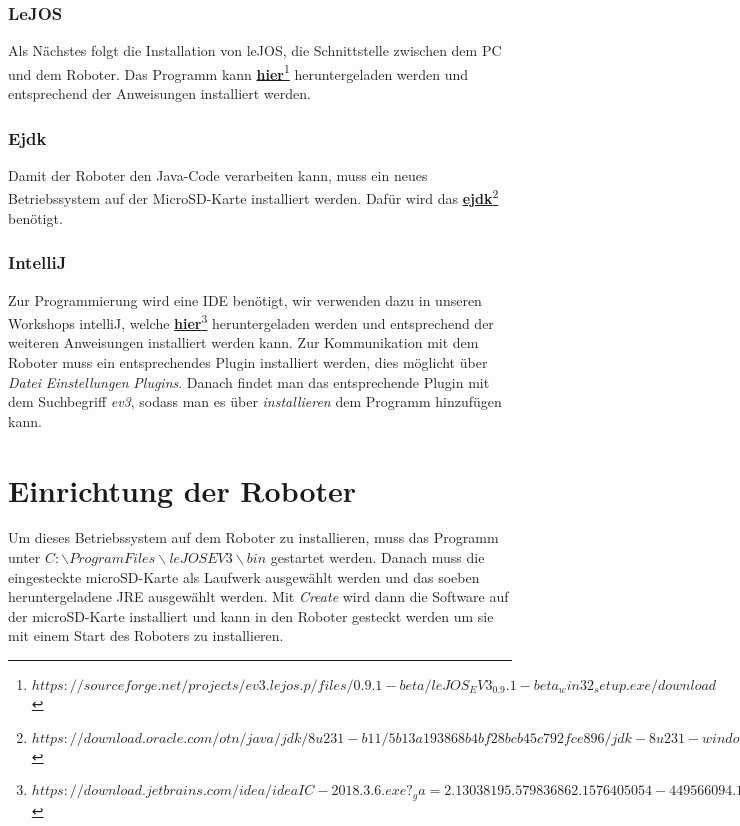\documentclass[
	ngerman,
	accentcolor=1c,%
	]{tudapub}
\begin{document}
\subsubsection{LeJOS}
Als N\"achstes folgt die Installation von leJOS, die Schnittstelle zwischen dem PC und dem Roboter. Das Programm kann
\href{https://sourceforge.net/projects/ev3.lejos.p/files/0.9.1-beta/leJOS_EV3_0.9.1-beta_win32_setup.exe/download}{\textbf{hier}\footnote{$https://sourceforge.net/projects/ev3.lejos.p/files/0.9.1-beta/leJOS_EV3_0.9.1-beta_win32_setup.exe/download$}}
heruntergeladen werden und entsprechend der Anweisungen installiert werden.

\subsubsection{Ejdk}
Damit der Roboter den Java-Code verarbeiten kann, muss ein neues Betriebssystem auf der MicroSD-Karte installiert werden. Daf\"ur wird das 
\href{https://download.oracle.com/otn/java/jdk/8u231-b11/5b13a193868b4bf28bcb45c792fce896/jdk-8u231-windows-i586.exe}{\textbf{ejdk}\footnote{$https://download.oracle.com/otn/java/jdk/8u231-b11/5b13a193868b4bf28bcb45c792fce896/jdk-8u231-windows-i586.exe$}} ben\"otigt.

\subsubsection{IntelliJ}
Zur Programmierung wird eine IDE ben\"otigt, wir verwenden dazu in unseren Workshops intelliJ, welche 
\href{https://download.jetbrains.com/idea/ideaIC-2018.3.6.exe?_ga=2.13038195.579836862.1576405054-449566094.1572879017}{\textbf{hier}\footnote{$https://download.jetbrains.com/idea/ideaIC-2018.3.6.exe?_ga=2.13038195.579836862.1576405054-449566094.1572879017$}}
heruntergeladen werden und entsprechend der weiteren Anweisungen installiert werden kann. Zur Kommunikation mit dem Roboter muss ein entsprechendes Plugin installiert werden, dies möglicht über \textit{Datei} \rightarrow{} \textit{Einstellungen} \rightarrow{} \textit{Plugins}. Danach findet man das entsprechende Plugin mit dem Suchbegriff \textit{ev3}, sodass man es \"uber \textit{installieren} dem Programm hinzuf\"ugen kann.

\section{Einrichtung der Roboter}
Um dieses Betriebssystem auf dem Roboter zu installieren, muss das Programm unter \textit{$C:\backslash Program Files\backslash leJOS EV3\backslash bin$} gestartet werden.\newline
Danach muss die eingesteckte microSD-Karte als Laufwerk ausgew\"ahlt werden und das soeben heruntergeladene JRE ausgew\"ahlt werden. Mit \textit{Create} wird dann die Software auf der microSD-Karte installiert und kann in den Roboter gesteckt werden um sie mit einem Start des Roboters zu installieren.
\end{document}
